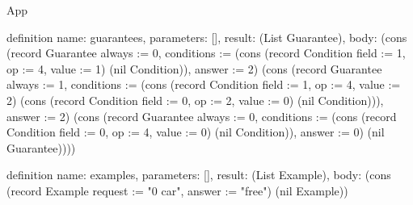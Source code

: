 \begin{lexlean}{App}
\begin{semanticmodule}
definition{
  name: guarantees,
  parameters: [],
  result: (List Guarantee),
  body: (cons (record Guarantee {always := 0, conditions := (cons (record Condition {field := 1, op := 4, value := 1}) (nil Condition)), answer := 2}) (cons (record Guarantee {always := 1, conditions := (cons (record Condition {field := 1, op := 4, value := 2}) (cons (record Condition {field := 0, op := 2, value := 0}) (nil Condition))), answer := 2}) (cons (record Guarantee {always := 0, conditions := (cons (record Condition {field := 0, op := 4, value := 0}) (nil Condition)), answer := 0}) (nil Guarantee))))
}

definition{
  name: examples,
  parameters: [],
  result: (List Example),
  body: (cons (record Example {request := "0 car", answer := "free"}) (nil Example))
}
\end{semanticmodule}
\end{lexlean}

